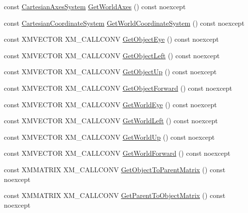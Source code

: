\begin{DoxyCompactItemize}
\item 
const \hyperlink{structmage_1_1_cartesian_axes_system}{Cartesian\+Axes\+System} \hyperlink{classmage_1_1_transform_node_aca4f35bb8aaffabc8c825133a7a307e9}{Get\+World\+Axes} () const noexcept
\item 
const \hyperlink{structmage_1_1_cartesian_coordinate_system}{Cartesian\+Coordinate\+System} \hyperlink{classmage_1_1_transform_node_a511e55c63c15d9e8958f33b298b6c103}{Get\+World\+Coordinate\+System} () const noexcept
\item 
const X\+M\+V\+E\+C\+T\+OR X\+M\+\_\+\+C\+A\+L\+L\+C\+O\+NV \hyperlink{classmage_1_1_transform_node_ad2699ad705ab94b638905512caef9b8c}{Get\+Object\+Eye} () const noexcept
\item 
const X\+M\+V\+E\+C\+T\+OR X\+M\+\_\+\+C\+A\+L\+L\+C\+O\+NV \hyperlink{classmage_1_1_transform_node_a88263e8746d271601c693b200f8bf1f2}{Get\+Object\+Left} () const noexcept
\item 
const X\+M\+V\+E\+C\+T\+OR X\+M\+\_\+\+C\+A\+L\+L\+C\+O\+NV \hyperlink{classmage_1_1_transform_node_a5555620371a98a81a6459326c1ccbfe9}{Get\+Object\+Up} () const noexcept
\item 
const X\+M\+V\+E\+C\+T\+OR X\+M\+\_\+\+C\+A\+L\+L\+C\+O\+NV \hyperlink{classmage_1_1_transform_node_ac59bd5c73cf6344a34bdf4f2d9cbc392}{Get\+Object\+Forward} () const noexcept
\item 
const X\+M\+V\+E\+C\+T\+OR X\+M\+\_\+\+C\+A\+L\+L\+C\+O\+NV \hyperlink{classmage_1_1_transform_node_a6263c16d3dd3f7dd4bd7ba8c01f82a9a}{Get\+World\+Eye} () const noexcept
\item 
const X\+M\+V\+E\+C\+T\+OR X\+M\+\_\+\+C\+A\+L\+L\+C\+O\+NV \hyperlink{classmage_1_1_transform_node_a9569d0014fbee2a3d1179b1acbb402f8}{Get\+World\+Left} () const noexcept
\item 
const X\+M\+V\+E\+C\+T\+OR X\+M\+\_\+\+C\+A\+L\+L\+C\+O\+NV \hyperlink{classmage_1_1_transform_node_acf4f03618f5e70314a71e65d968ec3f1}{Get\+World\+Up} () const noexcept
\item 
const X\+M\+V\+E\+C\+T\+OR X\+M\+\_\+\+C\+A\+L\+L\+C\+O\+NV \hyperlink{classmage_1_1_transform_node_a3127ed33bacba53bf452faae0dac8a4f}{Get\+World\+Forward} () const noexcept
\item 
const X\+M\+M\+A\+T\+R\+IX X\+M\+\_\+\+C\+A\+L\+L\+C\+O\+NV \hyperlink{classmage_1_1_transform_node_a5a033042b5fa230b11533aa7d7001694}{Get\+Object\+To\+Parent\+Matrix} () const noexcept
\item 
const X\+M\+M\+A\+T\+R\+IX X\+M\+\_\+\+C\+A\+L\+L\+C\+O\+NV \hyperlink{classmage_1_1_transform_node_ae707a161018d7018ec989ddb1a821962}{Get\+Parent\+To\+Object\+Matrix} () const noexcept

\end{DoxyCompactItemize}
